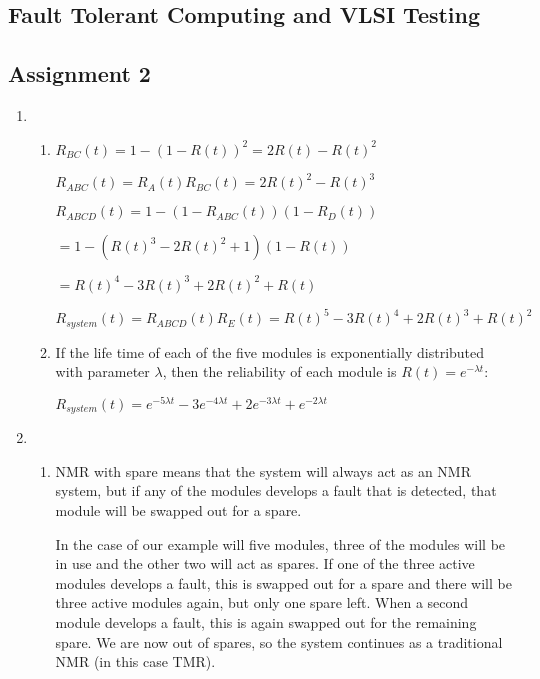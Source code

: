\documentclass[a4paper,12pt]{article}
\begin{document}
    \begin{center}
        \section*{Fault Tolerant Computing and VLSI Testing}
        \subsection*{Assignment 2}
    \end{center}

    \begin{enumerate}

        \item
            \begin{enumerate}
                \item $R_{BC}(t) = 1 - (1 - R(t))^2 = 2R(t) - R(t)^2$

                    $R_{ABC}(t) = R_A(t)R_{BC}(t) = 2R(t)^2 - R(t)^3$

                    $R_{ABCD}(t) = 1 - (1 - R_{ABC}(t))(1 - R_D(t))$

                    $= 1 - (R(t)^3 - 2R(t)^2 + 1)(1 - R(t))$

                    $= R(t)^4 - 3R(t)^3 + 2R(t)^2 + R(t)$

                    $R_{system}(t) = R_{ABCD}(t)R_E(t) = R(t)^5 - 3R(t)^4 + 2R(t)^3 + R(t)^2$

                \item If the life time of each of the five modules is exponentially distributed with parameter $\lambda$, then the reliability of each module is $R(t) = e^{-\lambda t}$:

                    $R_{system}(t) = e^{-5\lambda t} - 3e^{-4\lambda t} + 2e^{-3\lambda t} + e^{-2\lambda t}$
            \end{enumerate}

        \item 
            \begin{enumerate}
                \item NMR with spare means that the system will always act as an NMR system, but if any of the modules develops a fault that is detected, that module will be swapped out for a spare.

                    In the case of our example will five modules, three of the modules will be in use and the other two will act as spares. If one of the three active modules develops a fault, this is swapped out for a spare and there will be three active modules again, but only one spare left. When a second module develops a fault, this is again swapped out for the remaining spare. We are now out of spares, so the system continues as a traditional NMR (in this case TMR).


\end{enumerate}
\end{enumerate}
\end{document}
